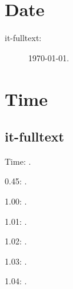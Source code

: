 \documentclass[italian]{article}
\begin{document}
\section{Date}

\begin{description}
\item[it-fulltext:]
\today.


\end{description}

\section{Time}
\subsection{it-fulltext}
Time: \DTMcurrenttime.

%
%
%
%
%
%
%
%
%
%
%
%
%
%
%
%
%
%
%
%
%
%
%
%
%
%
0.45: .
%
%

1.00:  .

1.01:  .

1.02:  .

1.03:  .

1.04:  .
\end{document}
